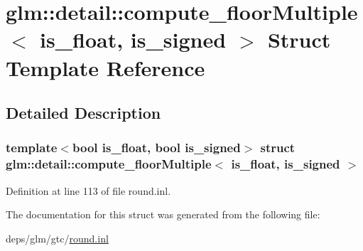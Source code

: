 \hypertarget{structglm_1_1detail_1_1compute__floorMultiple}{}\section{glm\+:\+:detail\+:\+:compute\+\_\+floor\+Multiple$<$ is\+\_\+float, is\+\_\+signed $>$ Struct Template Reference}
\label{structglm_1_1detail_1_1compute__floorMultiple}


\subsection{Detailed Description}
\subsubsection*{template$<$bool is\+\_\+float, bool is\+\_\+signed$>$\newline
struct glm\+::detail\+::compute\+\_\+floor\+Multiple$<$ is\+\_\+float, is\+\_\+signed $>$}



Definition at line 113 of file round.\+inl.



The documentation for this struct was generated from the following file\+:\begin{DoxyCompactItemize}
\item 
deps/glm/gtc/\hyperlink{round_8inl}{round.\+inl}\end{DoxyCompactItemize}
